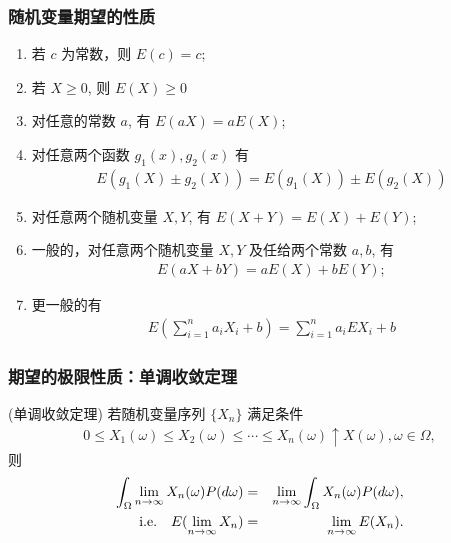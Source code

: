 	\begin{frame}
		\frametitle{随机变量期望的性质}
		\begin{enumerate}[<+-|alert@+>]
			\item 若 $c$ 为常数，则 $E (c)=c$;
			\item 若 $X\ge 0$, 则 $E (X)\ge 0$
			\item 对任意的常数 $a$, 有 $E (aX)=aE (X)$;
			\item 对任意两个函数 $g_1 (x),g_2 (x)$ 有
			\begin{eqnarray*}
				E(g_1(X)\pm g_2(X))=E(g_1(X))\pm E(g_2(X))
			\end{eqnarray*}
			\item 对任意两个随机变量 $X,Y$, 有 $E (X+Y)=E (X)+E (Y)$;
			\item 一般的，对任意两个随机变量 $X,Y$ 及任给两个常数 $a,b$, 有
			\begin{eqnarray*}
				E(aX+bY)=aE(X)+bE(Y);
			\end{eqnarray*}
			\item 更一般的有
			\begin{eqnarray*}
				E(\sum_{i=1}^na_iX_i+b)=\sum_{i=1}^na_iEX_i+b
			\end{eqnarray*}



		\end{enumerate}
	\end{frame}
	\begin{frame}
		\frametitle{期望的极限性质：单调收敛定理}
		\begin{thm}
			(单调收敛定理) 若随机变量序列 $\{X_n\}$ 满足条件
			\begin{eqnarray*}
				0\leq X_1(\omega)\leq X_2(\omega)\leq \cdots \leq X_n(\omega)\uparrow X(\omega), \omega\in \Omega,
			\end{eqnarray*}
			则
			\begin{eqnarray*}
				\int_{\Omega}\lim_{n\rightarrow\infty}X_n(\omega)P(d\omega)&=& \lim_{n\rightarrow\infty}\int_\Omega X_n(\omega)P(d\omega), \\
				{\rm i.e.} \quad    E(\lim_{n\rightarrow\infty}X_n)&=&\lim_{n\rightarrow\infty}E(X_n).
			\end{eqnarray*}

		\end{thm}

	\end{frame}
